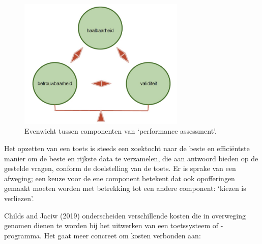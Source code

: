\documentclass[
  letterpaper,
]{report}
\begin{document}
\begin{figure}

{\centering \includegraphics[width=3.125in,height=\textheight]{./FIG11.jpg}

}

\caption{\label{fig-figuur11}Evenwicht tussen componenten van
`performance assessment'.}

\end{figure}

Het opzetten van een toets is steeds een zoektocht naar de beste en
efficiëntste manier om de beste en rijkste data te verzamelen, die aan
antwoord bieden op de gestelde vragen, conform de doelstelling van de
toets. Er is sprake van een afweging; een keuze voor de ene component
betekent dat ook opofferingen gemaakt moeten worden met betrekking tot
een andere component: `kiezen is verliezen'.

Childs and Jaciw (2019) onderscheiden verschillende kosten die in
overweging genomen dienen te worden bij het uitwerken van een
toetssysteem of -programma. Het gaat meer concreet om kosten verbonden
aan:
\end{document}
